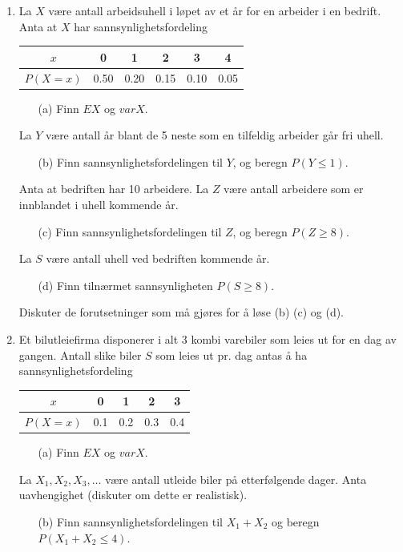 \begin{enumerate}
\item La $X$ være antall arbeidsuhell i løpet av et år for en
     arbeider i en bedrift. Anta at $X$ har
     sannsynlighetsfordeling
     \begin{center}
     \begin{tabular}{c|ccccc}
      $x$    &  0   &   1  &  2   &  3  &  4  \\  \hline
     $P(X=x)$&0.50  & 0.20 & 0.15 & 0.10 & 0.05
     \end{tabular}
     \end{center}
     \begin{itemize}
     \item[(a)]  Finn $EX$ og $varX$.
     \end{itemize}
     La $Y$ være antall år blant de 5 neste som en tilfeldig
     arbeider går fri uhell.
     \begin{itemize}
     \item[(b)]  Finn sannsynlighetsfordelingen til $Y$, og beregn
          $P(Y\leq 1)$.
     \end{itemize}
     Anta at bedriften har 10 arbeidere. La $Z$ være antall
     arbeidere som er innblandet i uhell kommende år.
     \begin{itemize}
     \item[(c)]  Finn sannsynlighetsfordelingen til $Z$, og beregn
          $P(Z\geq 8)$.
     \end{itemize}
     La $S$ være antall uhell ved bedriften kommende år.
     \begin{itemize}
     \item[(d)]  Finn tilnærmet sannsynligheten $P(S\geq 8)$.
     \end{itemize}
     Diskuter de forutsetninger som må gjøres for å løse (b) (c)
     og (d).


\item Et bilutleiefirma disponerer i alt 3 kombi varebiler som
     leies ut for en dag av gangen. Antall slike biler $S$ som
     leies ut pr. dag antas å ha sannsynlighetsfordeling
     \begin{center}
     \begin{tabular}{c|cccc}
      $x$    &  0 &  1  &  2  &  3   \\  \hline
     $P(X=x)$&0.1 & 0.2 & 0.3 & 0.4  
     \end{tabular}
     \end{center}
     \begin{itemize}
     \item[(a)]  Finn $EX$ og $varX$.
     \end{itemize}
     La $X_1, X_2, X_3, \ldots$ være antall utleide biler på
     etterfølgende dager. Anta uavhengighet (diskuter om dette er
     realistisk).
     \begin{itemize}
     \item[(b)]  Finn sannsynlighetsfordelingen til $X_1+X_2$ og beregn
          $P(X_1+X_2\leq 4)$.


\end{itemize}
\end{enumerate}
